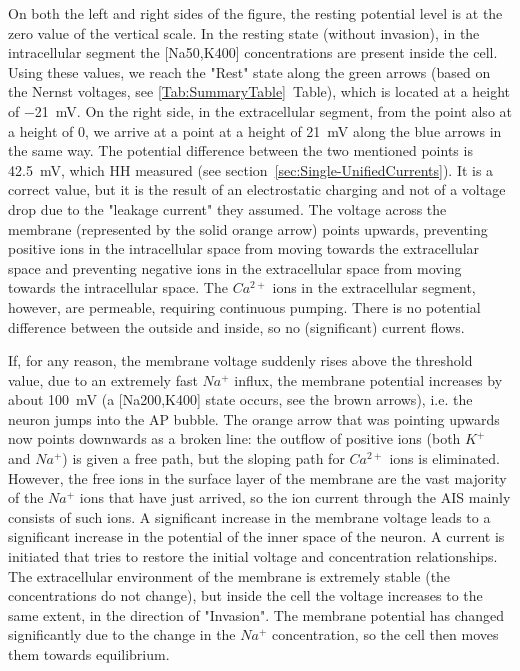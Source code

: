 On both the left and right sides of the figure, the resting potential level is
at the zero value of the vertical scale. In the resting state (without invasion),
in the intracellular segment
the [Na50,K400] concentrations are present inside the cell. Using these values, we reach the "Rest"
state along the green arrows (based on the Nernst voltages, see \ref{Tab:SummaryTable}~Table), which is located at a height of \SI{-21}{\milli\volt}.
On the right side, in the extracellular segment, from the point also at a height of 0, we arrive at a point at a height of \SI{21}{\milli\volt} along the blue arrows in the same way. The potential difference between the two mentioned points is \SI{42.5}{\milli\volt}, which \gls{HH} measured (see section~\ref{sec:Single-UnifiedCurrents}). It is a correct value,
but it is the result of an electrostatic charging and not of a voltage drop due to the "leakage current" they assumed.
The voltage across the membrane (represented by the solid orange arrow) points upwards, preventing positive ions in the intracellular space from moving towards the extracellular space and preventing negative ions in the extracellular space from moving towards the intracellular space. The $Ca^{2+}$ ions in the extracellular segment, however, are permeable, requiring continuous pumping. There is no potential difference between the outside and inside, so no (significant) current flows.

If, for any reason, the membrane voltage suddenly rises above the threshold value, due to an extremely fast $Na^+$ influx,
the membrane potential increases by about \SI{100}{\milli\volt} (a [Na200,K400] state occurs, see the brown arrows), i.e. the neuron jumps into the AP bubble.
The orange arrow that was pointing upwards now points downwards as a broken line: the outflow of positive ions (both $K^+$ and $Na^+$) is given a free path, but the sloping path for $Ca^{2+}$ ions is eliminated. However, the free ions in the surface layer of the membrane are the vast majority of the $Na^+$ ions that have just arrived, so the ion current through the \gls{AIS} mainly consists of such ions.
A significant increase in the membrane voltage leads to a significant increase in the potential of the
inner space of the neuron.
A current is initiated that tries to restore the initial voltage and concentration relationships.
The extracellular environment of the membrane is extremely stable (the concentrations do not change),
but inside the cell the voltage increases to the same extent, in the direction of "Invasion".
The membrane potential has changed significantly due to the change in the $Na^+$ concentration, so the cell then moves them towards equilibrium.


